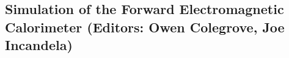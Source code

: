 
\subsection{Simulation of the Forward Electromagnetic Calorimeter (Editors: Owen Colegrove, Joe Incandela)}
